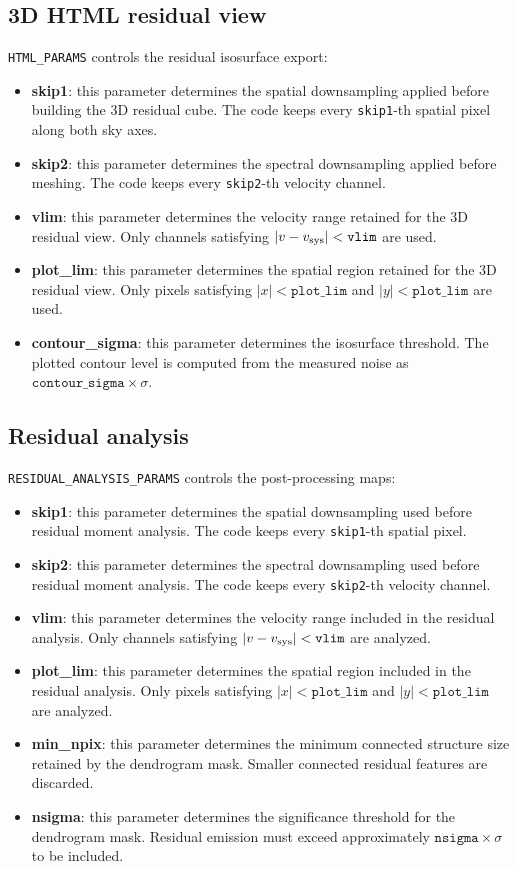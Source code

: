 \documentclass{report}
\begin{document}
\subsection{3D HTML residual view}
\texttt{HTML\_PARAMS} controls the residual isosurface export:
\begin{itemize}
    \item \textbf{skip1}: this parameter determines the spatial downsampling applied before building the 3D residual cube. The code keeps every \texttt{skip1}-th spatial pixel along both sky axes.
    \item \textbf{skip2}: this parameter determines the spectral downsampling applied before meshing. The code keeps every \texttt{skip2}-th velocity channel.
    \item \textbf{vlim}: this parameter determines the velocity range retained for the 3D residual view. Only channels satisfying $|v-v_{\rm sys}| < \texttt{vlim}$ are used.
    \item \textbf{plot\_lim}: this parameter determines the spatial region retained for the 3D residual view. Only pixels satisfying $|x| < \texttt{plot\_lim}$ and $|y| < \texttt{plot\_lim}$ are used.
    \item \textbf{contour\_sigma}: this parameter determines the isosurface threshold. The plotted contour level is computed from the measured noise as $\texttt{contour\_sigma} \times \sigma$.
\end{itemize}

\subsection{Residual analysis}
\texttt{RESIDUAL\_ANALYSIS\_PARAMS} controls the post-processing maps:
\begin{itemize}
    \item \textbf{skip1}: this parameter determines the spatial downsampling used before residual moment analysis. The code keeps every \texttt{skip1}-th spatial pixel.
    \item \textbf{skip2}: this parameter determines the spectral downsampling used before residual moment analysis. The code keeps every \texttt{skip2}-th velocity channel.
    \item \textbf{vlim}: this parameter determines the velocity range included in the residual analysis. Only channels satisfying $|v-v_{\rm sys}| < \texttt{vlim}$ are analyzed.
    \item \textbf{plot\_lim}: this parameter determines the spatial region included in the residual analysis. Only pixels satisfying $|x| < \texttt{plot\_lim}$ and $|y| < \texttt{plot\_lim}$ are analyzed.
    \item \textbf{min\_npix}: this parameter determines the minimum connected structure size retained by the dendrogram mask. Smaller connected residual features are discarded.
    \item \textbf{nsigma}: this parameter determines the significance threshold for the dendrogram mask. Residual emission must exceed approximately $\texttt{nsigma} \times \sigma$ to be included.
\end{itemize}
\end{document}
